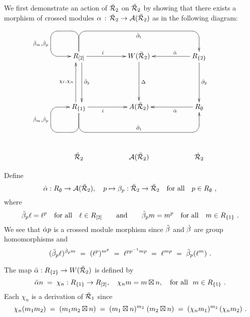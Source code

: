 \begin{pf}
We first demonstrate an action of $\dot{\mathcal{R}}_2$ on $\ddot{\mathcal{R}}_2$ by showing 
that there exists a morphism of crossed modules 
$\alpha \,:\, \dot{\mathcal{R}}_2 \to \mathcal{A}(\ddot{\mathcal{R}}_2)$ as in the following diagram:

\begin{equation}  \label{eq:xxmod-from-square-diag}
\vcenter{\xy
\xymatrix{ 
  &&&&&& \\
  &      R_{[2]} \ar[rr]^(0.4){\ddi} \ar[dd] <1.0ex>^{\ddbdyt}
           \ar `u[-1,1] `[0,4]_{\ddbdyo} [0,4]
           \ar `u[-1,-1] `[0,-1] `[0,0]_{\ddb_m, \ddb_p} [0,0]
   &&    W(\ddcalRt) \ar[dd]^{\Delta}
     &&  R_{\{2\}} \ar[ll]_(0.4){\dda} \ar[dd]^{\dbdyt} 
       & \\
  &&&&&& \\
  &      R_{\{1\}} \ar[rr]_(0.4){\di}  \ar[uu] <1.0ex>^{\chi_{\ell},\chi_n}
           \ar `d[1,1] `[0,4]^{\dbdyo} [0,4]
           \ar `d[1,-1] `[0,-1] `[0,0]^{\db_m, \db_p} [0,0]
   &&    A(\ddcalRt)
     &&  R_{\emptyset} \ar[ll]^(0.4){\da}
       & \\
  &&&&&& \\
  & \ddcalRt && \calA(\ddcalRt) && \dcalRt & \\
}
\endxy} 
\end{equation}

\medskip\noindent
Define 
$$
\dot{\alpha} : R_{\emptyset} \to \mathcal{A}(\ddot{\mathcal{R}}_2), \quad
p \mapsto \beta_p : \ddot{\mathcal{R}}_2 \to \ddot{\mathcal{R}}_2 
\quad\mbox{for all}\quad 
p \in R_{\emptyset}~,
$$
where  
$$
\ddot{\beta}_p \ell = \ell^p \quad\mbox{for all}\quad  \ell \in R_{[2]}
\qquad\mbox{and}\qquad  
\dot{\beta}_p m = m^p \quad\mbox{for all}\quad  m \in R_{\{1\}}~.
$$ 
We see that $\dot{\alpha} p$ is a crossed module morphism since $\ddot{\beta}$ and $\dot{\beta}$ are
group homomorphisms and 
$$
(\ddot{\beta}_p\ell)^{\dot{\beta}_pm} ~=~ (\ell^p)^{m^p} ~=~ \ell^{pp^{-1}mp} 
~=~ \ell^{mp} ~=~ \ddot{\beta}_p(\ell^m)~.
$$

\vspace*{12mm}\noindent
The map  $\ddot{\alpha} : R_{\{2\}} \to W(\ddot{\mathcal{R}}_2)$  is defined by
\begin{equation} \label{eq:chi-n-m}
\ddot{\alpha} n \;=\; \chi_n : R_{\{1\}} \to R_{[2]},\quad 
\chi_n m = m \boxtimes n, \quad 
\mbox{for all} ~~ m \in R_{\{1\}}~.
\end{equation}
Each  $\chi_n$  is a derivation of  $\ddot{\mathcal{R}}_1$   since
$$
\chi_n(m_1m_2) \;=\;
(m_1m_2 \boxtimes n) \;=\;
(m_1 \boxtimes n)^{m_2}\;(m_2 \boxtimes n) \;=\;
(\chi_n m_1)^{m_2}\,(\chi_n m_2)~.
$$


\end{pf}
